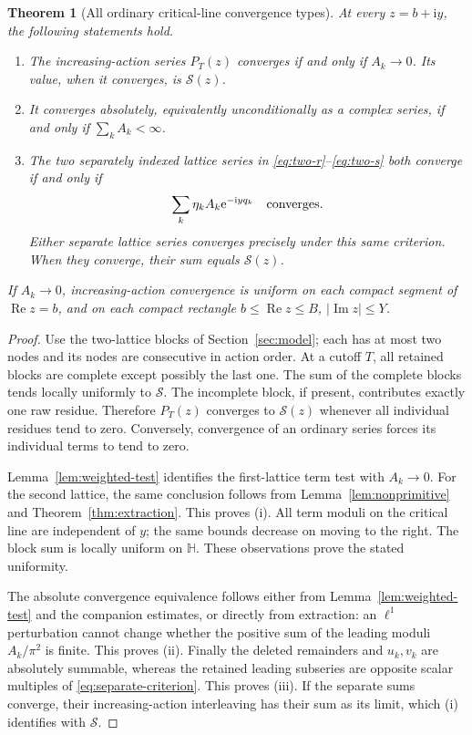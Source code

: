 \documentclass[11pt,a4paper]{article}
\numberwithin{equation}{section}
\newtheorem{theorem}{Theorem}[section]
\theoremstyle{definition}
\theoremstyle{remark}
\newcommand{\e}{\mathrm e}
\newcommand{\ii}{\mathrm i}
\newcommand{\re}{\operatorname{Re}}
\newcommand{\im}{\operatorname{Im}}
\newcommand{\Hh}{\mathbb H}
\newcommand{\Ssum}{\mathcal S}
\begin{document}
\begin{theorem}[All ordinary critical-line convergence types]
\label{thm:classification}
At every $z=b+\ii y$, the following statements hold.
\begin{enumerate}[label=\textup{(\roman*)}]
\item The increasing-action series $P_T(z)$ converges if and only if
$A_k\to0$. Its value, when it converges, is $\Ssum(z)$.
\item It converges absolutely, equivalently unconditionally as a complex
series, if and only if $\sum_k A_k<\infty$.
\item The two separately indexed lattice series in
\eqref{eq:two-r}--\eqref{eq:two-s} both converge if and only if
\begin{equation}
 \sum_k\eta_k A_k\e^{-\ii yq_k}
 \quad\hbox{converges.}
 \label{eq:separate-criterion}
\end{equation}
Either separate lattice series converges precisely under this same
criterion. When they converge, their sum equals $\Ssum(z)$.
\end{enumerate}
If $A_k\to0$, increasing-action convergence is uniform on each compact
segment of $\re z=b$, and on each compact rectangle
$b\le\re z\le B$, $|\im z|\le Y$.
\end{theorem}
\begin{proof}
Use the two-lattice blocks of Section~\ref{sec:model}; each has at most
two nodes and its nodes are consecutive in action order. At a cutoff
$T$, all retained blocks are complete except possibly the last one.
The sum of the complete blocks tends locally uniformly to $\Ssum$.
The incomplete block, if present, contributes exactly one raw residue.
Therefore $P_T(z)$ converges to $\Ssum(z)$ whenever all individual
residues tend to zero. Conversely, convergence of an ordinary series
forces its individual terms to tend to zero.

Lemma~\ref{lem:weighted-test} identifies the first-lattice term test
with $A_k\to0$. For the second lattice, the same conclusion follows
from Lemma~\ref{lem:nonprimitive} and Theorem~\ref{thm:extraction}.
This proves (i). All term moduli on the critical line are independent
of $y$; the same bounds decrease on moving to the right. The block
sum is locally uniform on $\Hh$. These observations prove the stated
uniformity.

The absolute convergence equivalence follows either from
Lemma~\ref{lem:weighted-test} and the companion estimates, or directly
from extraction: an $\ell^1$ perturbation cannot change whether the
positive sum of the leading moduli $A_k/\pi^2$ is finite. This proves
(ii). Finally the deleted remainders and $u_k,v_k$ are absolutely
summable, whereas the retained leading subseries are opposite scalar
multiples of \eqref{eq:separate-criterion}. This proves (iii).
If the separate sums converge, their increasing-action interleaving
has their sum as its limit, which (i) identifies with $\Ssum$.
\end{proof}
\end{document}
